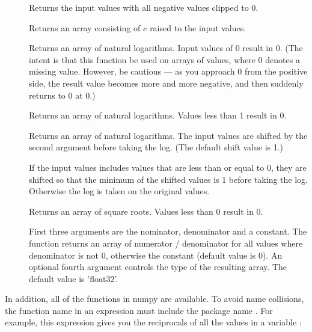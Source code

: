 \begin{description}

\item[] Returns the input values with all negative values
   clipped to 0. 

\item[] Returns an array consisting of $e$ raised to the input 
values.

\item[] Returns an array of natural logarithms.  Input values of 0
result in 0.  (The intent is that this function be used on arrays of
values, where 0 denotes a missing value.  However, be cautious --- as you
approach 0 from the positive side, the result value becomes more and more
negative, and then suddenly returns to 0 at 0.)  

\item[] Returns an array of natural logarithms. Values
less than 1 result in 0.  

\item[] Returns an array of natural logarithms.  The input
  values are shifted by the second argument before taking the log.  (The
  default shift value is 1.)  

\item[] If the input values includes values that are
less than or equal to 0, they are shifted so that the minimum of the
shifted values is 1 before taking the log.  Otherwise the log is taken on
the original values.  

\item[] Returns an array of square roots.  Values less than 0
  result in 0. 

\item[] First three arguments are the nominator, denominator and 
a constant. The function returns an array of numerator / denominator for all values where denominator is not 0,
otherwise the constant (default value is 0). An optional fourth argument controls
the type of the resulting array. The default value is 'float32'.
\end{description}

In addition, all of the functions in numpy are available.  To avoid name
collisions, the function name in an expression must include the package
name .  For example, this expression gives you the reciprocals
of all the values in a variable :

